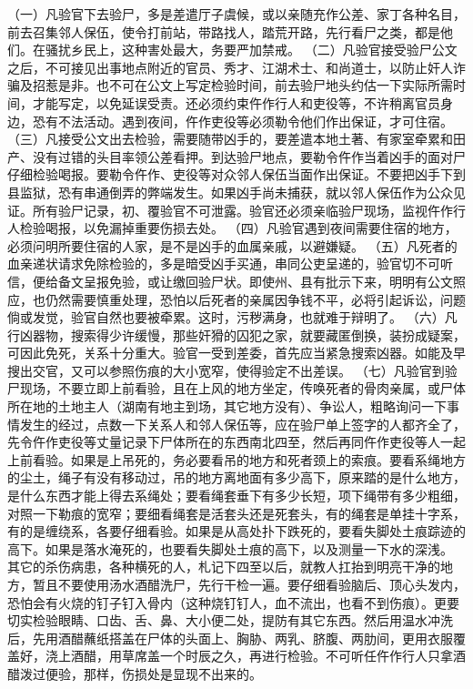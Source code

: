 \documentclass[12pt,UTF8]{ctexbook}
\begin{document}
（一）凡验官下去验尸，多是差遣厅子虞候，或以亲随充作公差、家丁各种名目，前去召集邻人保伍，使令打前站，带路找人，踏荒开路，先行看尸之类，都是他们。在骚扰乡民上，这种害处最大，务要严加禁戒。
（二）凡验官接受验尸公文之后，不可接见出事地点附近的官员、秀才、江湖术士、和尚道士，以防止奸人诈骗及招惹是非。也不可在公文上写定检验时间，前去验尸地头约估一下实际所需时间，才能写定，以免延误受责。还必须约束仵作行人和吏役等，不许稍离官员身边，恐有不法活动。遇到夜间，仵作吏役等必须勒令他们作出保证，才可住宿。
（三）凡接受公文出去检验，需要随带凶手的，要差遣本地土著、有家室牵累和田产、没有过错的头目率领公差看押。到达验尸地点，要勒令仵作当着凶手的面对尸仔细检验喝报。要勒令仵作、吏役等对众邻人保伍当面作出保证。不要把凶手下到县监狱，恐有串通倒弄的弊端发生。如果凶手尚未捕获，就以邻人保伍作为公众见证。所有验尸记录，初、覆验官不可泄露。验官还必须亲临验尸现场，监视仵作行人检验喝报，以免漏掉重要伤损去处。
（四）凡验官遇到夜间需要住宿的地方，必须问明所要住宿的人家，是不是凶手的血属亲戚，以避嫌疑。
（五）凡死者的血亲递状请求免除检验的，多是暗受凶手买通，串同公吏呈递的，验官切不可听信，便给备文呈报免验，或让缴回验尸状。即使州、县有批示下来，明明有公文照应，也仍然需要慎重处理，恐怕以后死者的亲属因争钱不平，必将引起诉讼，问题倘或发觉，验官自然也要被牵累。这时，污秽满身，也就难于辩明了。
（六）凡行凶器物，搜索得少许缓慢，那些奸猾的囚犯之家，就要藏匿倒换，装扮成疑案，可因此免死，关系十分重大。验官一受到差委，首先应当紧急搜索凶器。如能及早搜出交官，又可以参照伤痕的大小宽窄，使得验定不出差误。
（七）凡验官到验尸现场，不要立即上前看验，且在上风的地方坐定，传唤死者的骨肉亲属，或尸体所在地的土地主人（湖南有地主到场，其它地方没有）、争讼人，粗略询问一下事情发生的经过，点数一下关系人和邻人保伍等，应在验尸单上签字的人都齐全了，先令仵作吏役等丈量记录下尸体所在的东西南北四至，然后再同仵作吏役等人一起上前看验。如果是上吊死的，务必要看吊的地方和死者颈上的索痕。要看系绳地方的尘土，绳子有没有移动过，吊的地方离地面有多少高下，原来踏的是什么地方，是什么东西才能上得去系绳处；要看绳套垂下有多少长短，项下绳带有多少粗细，对照一下勒痕的宽窄；要细看绳套是活套头还是死套头，有的绳套是单挂十字系，有的是缠绕系，各要仔细看验。如果是从高处扑下跌死的，要看失脚处土痕踪迹的高下。如果是落水淹死的，也要看失脚处土痕的高下，以及测量一下水的深浅。
其它的杀伤病患，各种横死的人，札记下四至以后，就教人扛抬到明亮干净的地方，暂且不要使用汤水酒醋洗尸，先行干检一遍。要仔细看验脑后、顶心头发内，恐怕会有火烧的钉子钉入骨内（这种烧钉钉人，血不流出，也看不到伤痕）。更要切实检验眼睛、口齿、舌、鼻、大小便二处，提防有其它东西。然后用温水冲洗后，先用酒醋蘸纸搭盖在尸体的头面上、胸胁、两乳、脐腹、两肋间，更用衣服覆盖好，浇上酒醋，用草席盖一个时辰之久，再进行检验。不可听任仵作行人只拿酒醋泼过便验，那样，伤损处是显现不出来的。
\end{document}
